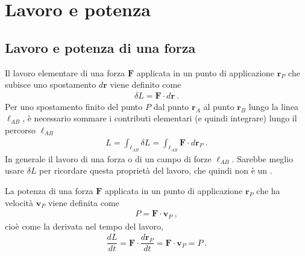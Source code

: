 \documentclass[letterpaper,10pt,english]{jupyterBook}
\begin{document}
\section{Lavoro e potenza}
\label{\detokenize{ch/actions-work-power:lavoro-e-potenza}}\label{\detokenize{ch/actions-work-power:classical-mechanics-actions-work-power}}\label{\detokenize{ch/actions-work-power::doc}}

\subsection{Lavoro e potenza di una forza}
\label{\detokenize{ch/actions-work-power:lavoro-e-potenza-di-una-forza}}
\sphinxAtStartPar
{} Il lavoro elementare di una forza \(\mathbf{F}\) applicata in un punto di applicazione \(\mathbf{r}_P\) che subisce uno spostamento \(d\mathbf{r}\) viene definito come
\begin{equation*}
\begin{split}\delta L = \mathbf{F} \cdot d \mathbf{r} \ .\end{split}
\end{equation*}
\sphinxAtStartPar
Per uno spostamento finito del punto \(P\) dal punto \(\mathbf{r}_A\) al punto \(\mathbf{r}_B\) lungo la linea \(\ell_{AB}\), è necessario sommare i contributi elementari (e quindi integrare) lungo il percorso \(\ell_{AB}\)
\begin{equation*}
\begin{split}L = \int_{\ell_{AB}} \delta L = \int_{\ell_{AB}} \mathbf{F} \cdot d \mathbf{r}_P \ .\end{split}
\end{equation*}
\sphinxAtStartPar
{} In generale il lavoro di una forza o di un campo di forze  \(\ell_{AB}\). Sarebbe meglio usare \(\delta L\) per ricordare questa proprietà del lavoro, che quindi non è un .

\sphinxAtStartPar
{} La potenza di una forza \(\mathbf{F}\) applicata in un punto di applicazione \(\mathbf{r}_P\) che ha velocità \(\mathbf{v}_P\) viene definita come
\begin{equation*}
\begin{split}P = \mathbf{F} \cdot \mathbf{v}_P \ ,\end{split}
\end{equation*}
\sphinxAtStartPar
cioè come la derivata nel tempo del lavoro,
\begin{equation*}
\begin{split}\dfrac{dL}{dt} = \mathbf{F} \cdot \dfrac{d \mathbf{r}_P}{d t} = \mathbf{F} \cdot \mathbf{v}_P = P \ .\end{split}
\end{equation*}
\end{document}
